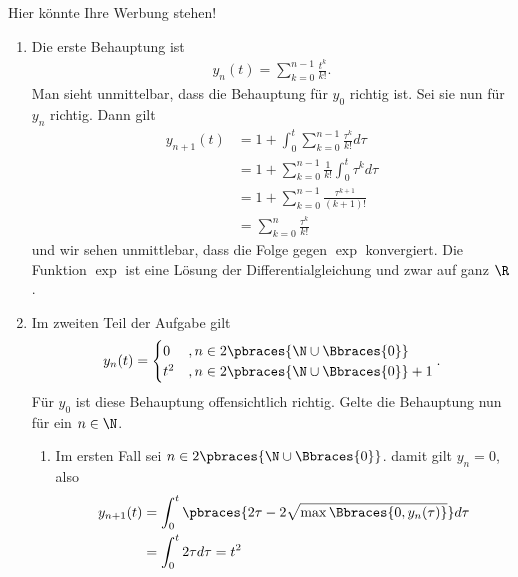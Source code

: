 \begin{solution}
    Hier könnte Ihre Werbung stehen!
    \begin{enumerate}[label = \alph*)]
        \item Die erste Behauptung ist
        \begin{align*}
        y_n(t) = \sum_{k = 0}^{n-1} \frac{t^k}{k!} .
        \end{align*}
        Man sieht unmittelbar, dass die Behauptung für $y_0$ richtig ist. Sei sie nun für $y_n$ richtig.
        Dann gilt
        \begin{align*}
            y_{n+1}(t) &= 1 + \int_0^t \sum_{k = 0}^{n-1} \frac{\tau^k}{k!} d\tau \\
            &= 1 +  \sum_{k = 0}^{n-1}\frac{1}{k!} \int_0^t \tau^k d\tau \\
            &= 1 + \sum_{k = 0}^{n-1} \frac{\tau^{k + 1}}{(k+1)!} \\
            &= \sum_{k = 0}^n \frac{\tau^k}{k!}
        \end{align*}
        und wir sehen unmittlebar, dass die Folge gegen $\exp$ konvergiert. Die Funktion $\exp$ ist eine Lösung der Differentialgleichung und zwar auf ganz $\R$.

        \item Im zweiten Teil der Aufgabe gilt
        \begin{align*}
            y_n(t) = 
            \begin{cases}
                0 &, n \in 2 \pbraces{\N \cup \Bbraces{0}} \\
                t^2 &, n \in 2 \pbraces{\N \cup \Bbraces{0}} + 1
            \end{cases} .
        \end{align*}
        Für $y_0$ ist diese Behauptung offensichtlich richtig. Gelte die Behauptung nun für ein $n \in \N$.
        \begin{enumerate}[label = \roman*)]
            \item Im ersten Fall sei $n \in 2 \pbraces{\N \cup \Bbraces{0}}$. damit gilt $y_n = 0$, also 
            \begin{align*}
                y_{n+1}(t) &= \int_0^t \pbraces{2\tau - 2 \sqrt{\max\Bbraces{0, y_n(\tau)}}} d\tau \\
                &= \int_0^t 2\tau d\tau = t^2
            \end{align*}


\end{enumerate}
\end{enumerate}
\end{solution}
